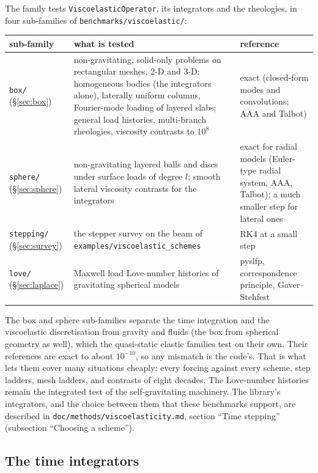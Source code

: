 \documentclass[11pt]{article}
\numberwithin{equation}{section}
\newcommand{\code}[1]{\texttt{#1}}
\begin{document}
The family tests \code{ViscoelasticOperator}, its integrators and the
rheologies, in four sub-families of \code{benchmarks/viscoelastic/}:
\begin{center}
\small
\begin{tabular}{@{}lP{8.2cm}P{4.2cm}@{}}
\toprule
sub-family & what is tested & reference \\
\midrule
\code{box/} (\S\ref{sec:box}) & non-gravitating, solid-only problems on
rectangular meshes, 2-D and 3-D: homogeneous bodies (the integrators
alone), laterally uniform columns, Fourier-mode loading of layered slabs;
general load histories, multi-branch rheologies, viscosity contrasts to
$10^8$ & exact (closed-form modes and convolutions; AAA and Talbot) \\
\code{sphere/} (\S\ref{sec:sphere}) & non-gravitating layered balls and
discs under surface loads of degree $l$; smooth lateral viscosity
contrasts for the integrators & exact for radial models (Euler-type radial
system, AAA, Talbot); a much smaller step for lateral ones \\
\code{stepping/} (\S\ref{sec:survey}) & the stepper survey on the beam of
\code{examples/viscoelastic\_schemes} & RK4 at a small step \\
\code{love/} (\S\ref{sec:laplace}) & Maxwell load Love-number histories of
gravitating spherical models & pyslfp, correspondence principle,
Gaver--Stehfest \\
\bottomrule
\end{tabular}
\end{center}
The box and sphere sub-families separate the time integration and the
viscoelastic discretisation from gravity and fluids (the box from
spherical geometry as well), which the quasi-static elastic families
test on their own. Their references are exact to about $10^{-10}$, so any
mismatch is the code's. That is what lets them cover many situations
cheaply: every forcing against every scheme, step ladders, mesh ladders,
and contrasts of eight decades. The Love-number histories remain the
integrated test of the self-gravitating machinery. The library's
integrators, and the choice between them that these benchmarks support,
are described in \code{doc/methods/viscoelasticity.md}, section ``Time stepping''
(subsection ``Choosing a scheme'').

\subsection{The time integrators}
\label{sec:steppers}
\end{document}
